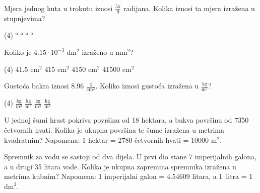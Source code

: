 \begin{zadatak}
	Mjera jednog kuta u trokutu iznosi $\displaystyle \frac{5\pi}{9}$ radijana.
	Kolika iznosi ta mjera izražena u stupnjevima?
    \begin{tasks}(4)
		°
		°
		°
		°
	\end{tasks}
\end{zadatak}

\pagebreak

\begin{zadatak}
	Koliko je $4.15 \cdot 10^{-3}$ dm$^2$ izraženo u mm$^2$?
    \begin{tasks}(4)
		\task $41.5$ cm$^2$
		\task $415$ cm$^2$
		\task $4150$ cm$^2$
		\task $41500$ cm$^2$
	\end{tasks}
\end{zadatak}

\begin{zadatak}
	Gustoća bakra iznosi 8.96 $\displaystyle \frac{\text{g}}{\text{cm}^3}$.
	Koliko iznosi gustoća izražena u $\displaystyle \frac{\text{kg}}{\text{m}^3}$?
    \begin{tasks}(4)
		 $\displaystyle \frac{\text{kg}}{\text{m}^3}$
		 $\displaystyle \frac{\text{kg}}{\text{m}^3}$
		 $\displaystyle \frac{\text{kg}}{\text{m}^3}$
		 $\displaystyle \frac{\text{kg}}{\text{m}^3}$
	\end{tasks}
\end{zadatak}

\begin{zadatak}
	U jednoj šumi hrast pokriva površinu od 18 hektara, a bukva površinu od 7350 četvornih hvati.
	Kolika je ukupna površina te šume izražena u metrima kvadratnim?
	Napomena: 1 hektar = 2780 četvornih hvati = 10000 $\text{m}^2$.
\end{zadatak}

\begin{zadatak}
	Spremnik za vodu se sastoji od dva dijela.
	U prvi dio stane 7 imperijalnih galona, a u  drugi 35 litara vode.
	Kolika je ukupna zapremina spremnika izražena u metrima kubnim?
	Napomena: 1 imperijalni galon = 4.54609 litara, a 1~litra = 1~$\text{dm}^2$.
\end{zadatak}

\newpage